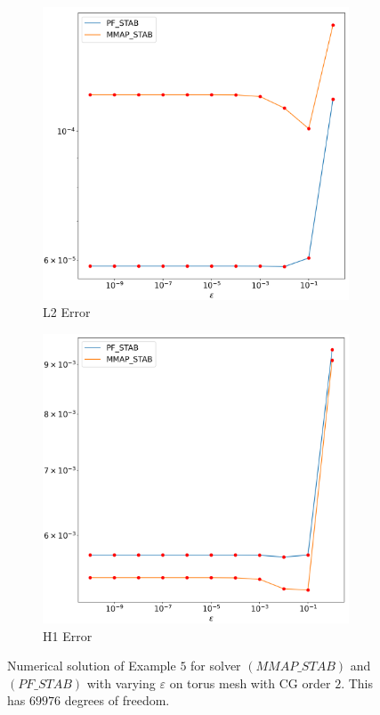 \documentclass[12pt]{ociamthesis}
\begin{document}
\begin{figure}[H]
 \begin{subfigure}{0.5\textwidth}
     \includegraphics[width=\textwidth]{Pics/LHSims/E5/E5_STABL2.png}
     \caption{L2 Error}
 \end{subfigure}
   \begin{subfigure}{0.5\textwidth}
     \includegraphics[width=\textwidth]{Pics/LHSims/E5/E5_STABH1.png}
     \caption{H1 Error}
 \end{subfigure}
 \caption{Numerical solution of Example $5$ for solver $(MMAP\_STAB)$ and $(PF\_STAB)$ with varying $\varepsilon$ on torus mesh with CG order $2$. This has $69976$ degrees of freedom.} \label{E5_eps}
\end{figure}
\end{document}
